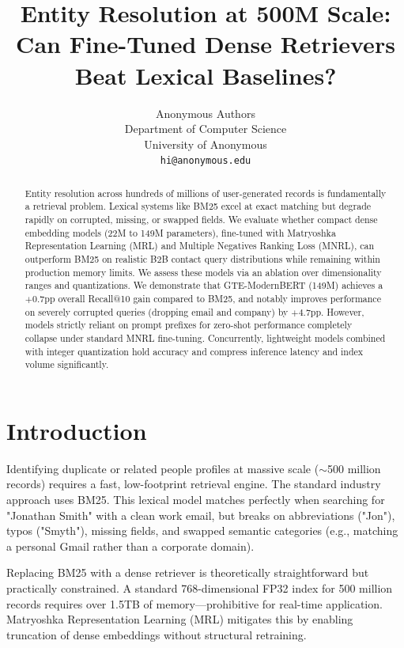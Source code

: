 \documentclass{article}
\title{Entity Resolution at 500M Scale: Can Fine-Tuned Dense Retrievers Beat Lexical Baselines?}
\author{%
  Anonymous Authors \\
  Department of Computer Science\\
  University of Anonymous\\
  \texttt{hi@anonymous.edu} \\
}
\begin{document}
\maketitle

\begin{abstract}
Entity resolution across hundreds of millions of user-generated records is fundamentally a retrieval problem. Lexical systems like BM25 excel at exact matching but degrade rapidly on corrupted, missing, or swapped fields. We evaluate whether compact dense embedding models (22M to 149M parameters), fine-tuned with Matryoshka Representation Learning (MRL) and Multiple Negatives Ranking Loss (MNRL), can outperform BM25 on realistic B2B contact query distributions while remaining within production memory limits. We assess these models via an ablation over dimensionality ranges and quantizations. We demonstrate that GTE-ModernBERT (149M) achieves a $+0.7$pp overall Recall@10 gain compared to BM25, and notably improves performance on severely corrupted queries (dropping email and company) by $+4.7$pp. However, models strictly reliant on prompt prefixes for zero-shot performance completely collapse under standard MNRL fine-tuning. Concurrently, lightweight models combined with integer quantization hold accuracy and compress inference latency and index volume significantly.
\end{abstract}

\section{Introduction}

Identifying duplicate or related people profiles at massive scale ($\sim$500 million records) requires a fast, low-footprint retrieval engine. The standard industry approach uses BM25. This lexical model matches perfectly when searching for "Jonathan Smith" with a clean work email, but breaks on abbreviations ("Jon"), typos ("Smyth"), missing fields, and swapped semantic categories (e.g., matching a personal Gmail rather than a corporate domain). 

Replacing BM25 with a dense retriever is theoretically straightforward but practically constrained. A standard 768-dimensional FP32 index for 500 million records requires over 1.5TB of memory—prohibitive for real-time application. Matryoshka Representation Learning (MRL) \cite{kusner2015matryoshka} mitigates this by enabling truncation of dense embeddings without structural retraining. 
\end{document}
